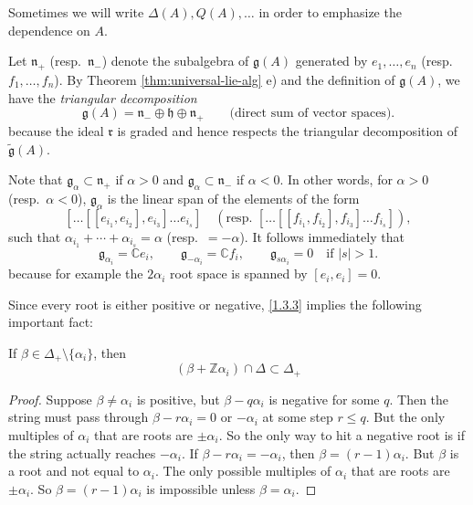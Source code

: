 \documentclass[12pt]{article}
\begin{document}
Sometimes we will write $\Delta(A), Q(A), \dots$ in order to emphasize the
dependence on $A$.

Let $\mathfrak{n}_+$ (resp.\ $\mathfrak{n}_-$) denote the subalgebra of
$\mathfrak{g}(A)$ generated by $e_1,\dots,e_n$ (resp.\ $f_1,\dots,f_n$).
By Theorem \ref{thm:universal-lie-alg} e) and the definition of $\mathfrak{g}(A)$, we have the \emph{triangular decomposition}
\[
    \mathfrak{g}(A) = \mathfrak{n}_- \oplus \mathfrak{h} \oplus \mathfrak{n}_+
    \qquad \text{(direct sum of vector spaces).}
\] because the ideal $\mathfrak{r}$ is graded and hence respects the triangular decomposition of $\tilde{\mathfrak{g}}(A)$.

Note that $\mathfrak{g}_\alpha \subset \mathfrak{n}_+$ if $\alpha>0$ and
$\mathfrak{g}_\alpha \subset \mathfrak{n}_-$ if $\alpha<0$. In other words,
for $\alpha>0$ (resp.\ $\alpha<0$), $\mathfrak{g}_\alpha$ is the linear span
of the elements of the form
\[
    [\dots [[e_{i_1},e_{i_2}],e_{i_3}] \dots e_{i_s}]
    \quad (\text{resp.\ } [\dots [[f_{i_1},f_{i_2}],f_{i_3}] \dots f_{i_s}]),
\]
such that $\alpha_{i_1}+\cdots+\alpha_{i_s} = \alpha$
(resp.\ $= -\alpha$). It follows immediately that
\begin{equation}\label{1.3.3}
    \mathfrak{g}_{\alpha_i} = \mathbb{C}e_i, \qquad
    \mathfrak{g}_{-\alpha_i} = \mathbb{C}f_i, \qquad
    \mathfrak{g}_{s\alpha_i} = 0 \quad \text{if } |s|>1.
\end{equation}
because for example the $2\alpha_i$ root space is spanned by $[e_i,e_i] = 0$.

Since every root is either positive or negative, \eqref{1.3.3} implies the
following important fact:

\begin{lemma}{\label{lem:rt-string}}
    If $\beta \in \Delta_+ \setminus \{\alpha_i\}$, then
    $$(\beta + \mathbb{Z}\alpha_i)\cap \Delta \subset \Delta_+$$
\end{lemma}
\begin{proof}
    Suppose $\beta\neq \alpha_i$ is positive, but $\beta - q\alpha_i$ is negative for some $q$. Then the string must pass through $\beta - r\alpha_i = 0$ or $-\alpha_i$ at some step $r \leq q$. But the only multiples of $\alpha_i$ that are roots are $\pm \alpha_i$. So the only way to hit a negative root is if the string actually reaches $-\alpha_i$. If $\beta - r\alpha_i = -\alpha_i$, then $\beta = (r-1)\alpha_i$. But $\beta$ is a root and not equal to $\alpha_i$. The only possible multiples of $\alpha_i$ that are roots are $\pm\alpha_i$. So $\beta = (r-1)\alpha_i$ is impossible unless $\beta=\alpha_i$.
\end{proof}
\end{document}
